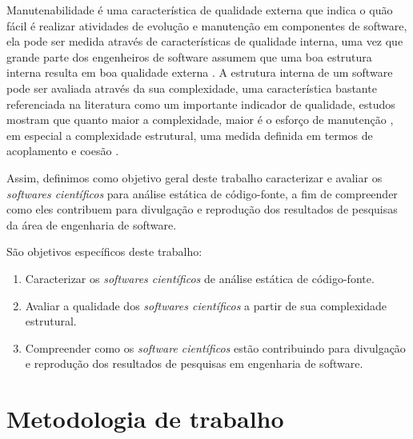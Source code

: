 Manutenabilidade é uma característica de qualidade externa que indica o quão
fácil é realizar atividades de evolução e manutenção em componentes de
software, ela pode ser medida através de características de qualidade interna,
uma vez que grande parte dos engenheiros de software assumem que uma boa
estrutura interna resulta em boa qualidade externa \cite{Fenton2014}. A
estrutura interna de um software pode ser avaliada através da sua complexidade,
uma característica bastante referenciada na literatura como um importante
indicador de qualidade, estudos mostram que quanto maior a complexidade, maior
é o esforço de manutenção \cite{hashim1996software, Darcy2005}, em especial a
complexidade estrutural, uma medida definida em termos de acoplamento e coesão
\cite{Terceiro2012}.


Assim, definimos como objetivo geral deste trabalho caracterizar e avaliar os
{\it softwares científicos} para análise estática de código-fonte, a fim de
compreender como eles contribuem para divulgação e reprodução dos resultados de
pesquisas da área de engenharia de software.

São objetivos específicos deste trabalho:

\begin{enumerate}
  \item Caracterizar os {\it softwares científicos} de análise estática de código-fonte.
  \item Avaliar a qualidade dos {\it softwares científicos} a partir de sua complexidade estrutural.
  \item Compreender como os {\it software científicos} estão contribuindo para divulgação e reprodução dos resultados de pesquisas em engenharia de software.
\end{enumerate}

\section{Metodologia de trabalho}

